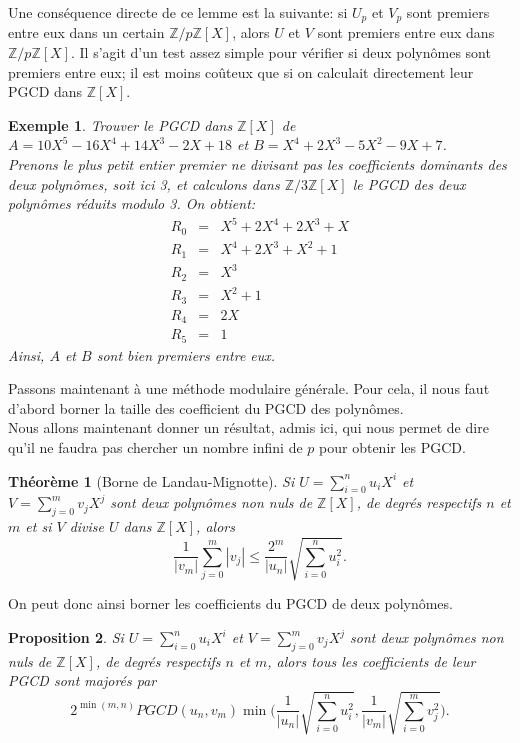 \documentclass[12pt]{report}
\newtheorem{thm}{Théorème}[chapter]
\newtheorem*{ex}{Exemple}
\newtheorem{Prop}[thm]{Proposition}
\begin{document}
Une conséquence directe de ce lemme est la suivante: si $U_p$ et $V_p$ sont premiers entre eux dans un certain $\mathbb{Z}/p\mathbb{Z}[X]$, alors $U$ et $V$ sont premiers entre eux dans $\mathbb{Z}/p\mathbb{Z}[X]$. Il s'agit d'un test assez simple pour vérifier si deux polynômes sont premiers entre eux; il est moins coûteux que si on calculait 
directement leur PGCD dans $\mathbb{Z}[X]$.

\begin{ex}
Trouver le PGCD dans $\mathbb{Z}[X]$ de $A=10X^5-16X^4 +14 X^3 -2X +18$ et $B=X^4+2X^3-5X^2-9X+7$. \\
Prenons le plus petit entier premier ne divisant pas  les coefficients dominants des deux polynômes, soit ici 3, et calculons dans $\mathbb{Z}/3 \mathbb{Z}[X]$ le PGCD des deux polynômes réduits modulo 3. On obtient:
 \begin{eqnarray*}
 R_0 &=&   X^5 +2X^4+2X^3+X \\
 R_1 &=& X^4+2X^3+X^2+1 \\
 R_2 &=& X^3 \\
 R_3 &=& X^2+1 \\
 R_4 &=& 2X \\
 R_5 &=& 1
 \end{eqnarray*}
 Ainsi, $A$ et $B$ sont bien premiers entre eux.
\end{ex}
 

Passons maintenant à une méthode modulaire générale. Pour cela, il nous faut d'abord borner la taille des coefficient du PGCD des polynômes.\\

Nous allons maintenant donner un résultat, admis ici, qui nous permet de dire qu'il ne faudra pas chercher un nombre infini de $p$ pour obtenir les PGCD.

\begin{thm}[Borne de Landau-Mignotte]
Si $U= \sum \limits_{i=0}^{n}u_iX^i$ et $V= \sum \limits_{j=0}^{m}v_jX^j$ sont deux polynômes non nuls de $\mathbb{Z}[X]$, de degrés respectifs $n$ et $m$ et si $V$ divise $U$ dans $\mathbb{Z}[X]$, alors
$$     \frac{1}{|v_m|} \sum_{j=0}^m |v_j| \leq \frac{2^m}{|u_n|} \sqrt{\sum_{i=0}^n u_i^2} .      $$
\end{thm}

On peut donc ainsi borner les coefficients du PGCD de deux polynômes.

\begin{Prop}
Si $U= \sum \limits_{i=0}^{n}u_iX^i$ et $V= \sum \limits_{j=0}^{m}v_jX^j$ sont deux polynômes non nuls de $\mathbb{Z}[X]$, de degrés respectifs $n$ et $m$, alors tous les coefficients de leur PGCD sont majorés par 
$$    2^{\min (m,n) }  PGCD(u_n  , v_m)  \min  \Big(  \frac{1}{|u_n|} \sqrt{\sum_{i=0}^n u_i^2} ,\frac{1}{|v_m|} \sqrt{\sum_{i=0}^m v_j^2}    \Big)   .         $$
\end{Prop}
\end{document}
